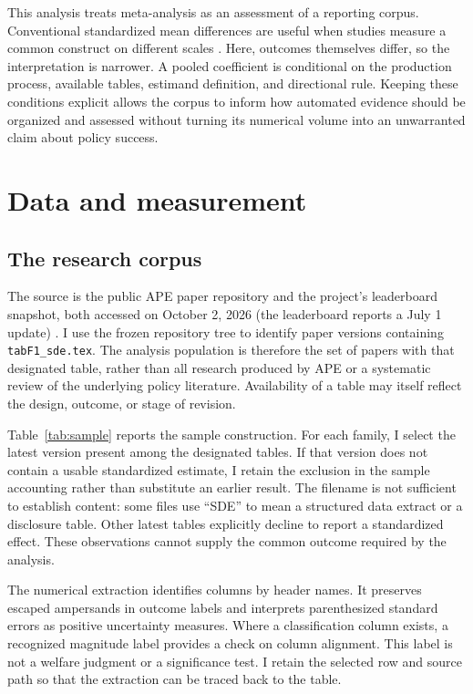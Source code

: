 \documentclass[11pt]{article}
\begin{document}
This analysis treats meta-analysis as an assessment of a reporting corpus. Conventional standardized mean differences are useful when studies measure a common construct on different scales \citep{cochrane}. Here, outcomes themselves differ, so the interpretation is narrower. A pooled coefficient is conditional on the production process, available tables, estimand definition, and directional rule. Keeping these conditions explicit allows the corpus to inform how automated evidence should be organized and assessed without turning its numerical volume into an unwarranted claim about policy success.

\section{Data and measurement}\label{sec:data}
\subsection{The research corpus}
The source is the public APE paper repository and the project's leaderboard snapshot, both accessed on October 2, 2026 (the leaderboard reports a July 1 update) \citep{ape,leaderboard}. I use the frozen repository tree to identify paper versions containing \texttt{tabF1\_sde.tex}. The analysis population is therefore the set of papers with that designated table, rather than all research produced by APE or a systematic review of the underlying policy literature. Availability of a table may itself reflect the design, outcome, or stage of revision.

Table~\ref{tab:sample} reports the sample construction. For each family, I select the latest version present among the designated tables. If that version does not contain a usable standardized estimate, I retain the exclusion in the sample accounting rather than substitute an earlier result. The filename is not sufficient to establish content: some files use ``SDE'' to mean a structured data extract or a disclosure table. Other latest tables explicitly decline to report a standardized effect. These observations cannot supply the common outcome required by the analysis.



The numerical extraction identifies columns by header names. It preserves escaped ampersands in outcome labels and interprets parenthesized standard errors as positive uncertainty measures. Where a classification column exists, a recognized magnitude label provides a check on column alignment. This label is not a welfare judgment or a significance test. I retain the selected row and source path so that the extraction can be traced back to the table.
\end{document}
